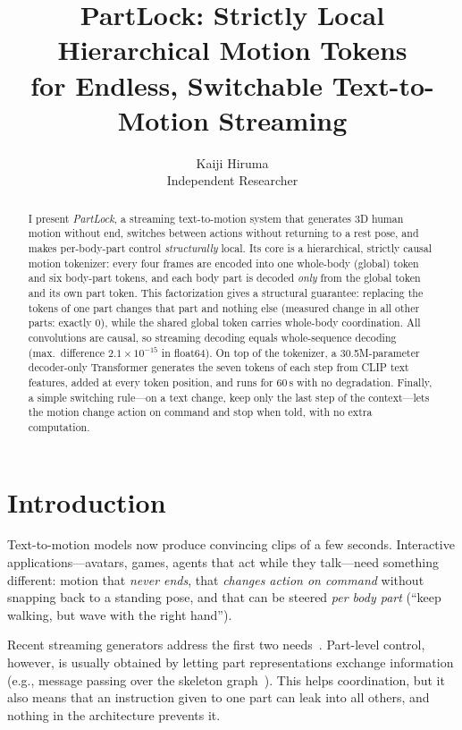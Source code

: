 \documentclass[11pt]{article}
\title{PartLock: Strictly Local Hierarchical Motion Tokens\\for Endless, Switchable Text-to-Motion Streaming}
\author{Kaiji Hiruma\\ \small Independent Researcher}
\date{}
\begin{document}
\maketitle

\begin{abstract}
I present \emph{PartLock}, a streaming text-to-motion system that generates 3D human motion
without end, switches between actions without returning to a rest pose, and makes per-body-part
control \emph{structurally} local.
Its core is a hierarchical, strictly causal motion tokenizer: every four frames are encoded into one
whole-body (global) token and six body-part tokens, and each body part is decoded \emph{only} from the
global token and its own part token.
This factorization gives a structural guarantee:
replacing the tokens of one part changes that part and nothing else (measured change in all other
parts: exactly $0$), while the shared global token carries whole-body coordination.
All convolutions are causal, so streaming decoding equals whole-sequence decoding
(max.\ difference $2.1\times10^{-15}$ in float64).
On top of the tokenizer, a 30.5M-parameter decoder-only Transformer generates the seven tokens of each
step from CLIP text features, added at every token position, and runs for 60\,s with no degradation.
Finally, a simple switching rule---on a text change, keep only the last step of the context---lets the
motion change action on command and stop when told, with no extra computation.
\end{abstract}

\section{Introduction}

Text-to-motion models now produce convincing clips of a few seconds.
Interactive applications---avatars, games, agents that act while they talk---need something different:
motion that \emph{never ends}, that \emph{changes action on command} without snapping back to a
standing pose, and that can be steered \emph{per body part} (``keep walking, but wave with the right
hand'').

Recent streaming generators address the first two needs~\cite{motionstreamer,dart,timelinecontrol}.
Part-level control, however, is usually obtained by letting part representations exchange information
(e.g., message passing over the skeleton graph~\cite{timelinecontrol}).
This helps coordination, but it also means that an instruction given to one part can leak into all
others, and nothing in the architecture prevents it.
\end{document}
